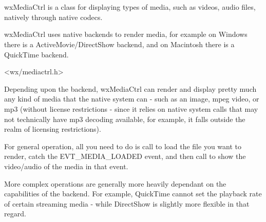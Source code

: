 
\section{}\label{wxmediactrl}

wxMediaCtrl is a class for displaying types of 
media, such as videos, audio files, natively through native codecs.

wxMediaCtrl uses native backends to render media, for example on Windows
there is a ActiveMovie/DirectShow backend, and on Macintosh there is a 
QuickTime backend.






<wx/mediactrl.h>



\label{renderingmediawxmediactrl}

Depending upon the backend, wxMediaCtrl can render
and display pretty much any kind of media that the native system can - 
such as an image, mpeg video, or mp3 (without license restrictions -
since it relies on native system calls that may not technically
have mp3 decoding available, for example, it falls outside the
realm of licensing restrictions).

For general operation, all you need to do is call 
 to load the file
you want to render, catch the EVT\_MEDIA\_LOADED event,
and then call  
to show the video/audio of the media in that event.

More complex operations are generally more heavily dependant on the
capabilities of the backend.  For example, QuickTime cannot set
the playback rate of certain streaming media - while DirectShow is 
slightly more flexible in that regard.


